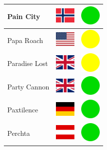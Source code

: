 \documentclass[12pt, a4paper, twoside]{report}
\begin{document}
\begin{center}
\begin{longtable}{|p{5cm}|p{2cm}|p{2cm}|}
Pain City & \includegraphics[width=1cm]{4x3/no} & \includegraphics[width=1cm]{likes/y} \\ \hline
Papa Roach & \includegraphics[width=1cm]{4x3/us} & \includegraphics[width=1cm]{likes/m} \\ \hline
Paradise Lost & \includegraphics[width=1cm]{4x3/gb} & \includegraphics[width=1cm]{likes/m} \\ \hline
Party Cannon & \includegraphics[width=1cm]{4x3/gb} & \includegraphics[width=1cm]{likes/y} \\ \hline
Paxtilence & \includegraphics[width=1cm]{4x3/de} & \includegraphics[width=1cm]{likes/y} \\ \hline
Perchta & \includegraphics[width=1cm]{4x3/at} & \includegraphics[width=1cm]{likes/y} \\ \hline

\end{longtable}
\end{center}
\end{document}
